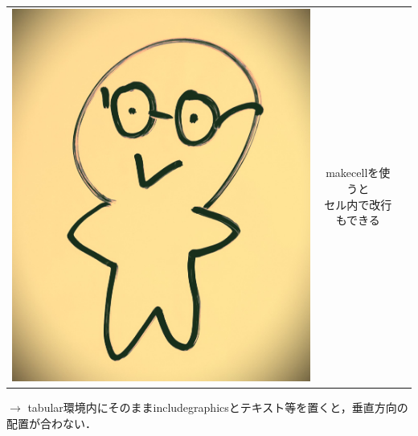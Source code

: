 \documentclass[unicode, 9pt, aspectratio=169]{beamer}
\begin{document}
\begin{frame}
\begin{center}
\begin{minipage}{.7\linewidth}
\begin{block}{}
\begin{tabular}{ccc}
                \includegraphics[height=.3\textheight]{figs/fig_mod.jpg}
                &
                \makecell{makecellを使うと \\ セル内で改行もできる}
            \end{tabular}
        \end{block}
    \end{minipage}
\end{center}

$\to$ tabular環境内にそのままincludegraphicsとテキスト等を置くと，垂直方向の配置が合わない．
\end{frame}
\end{document}
